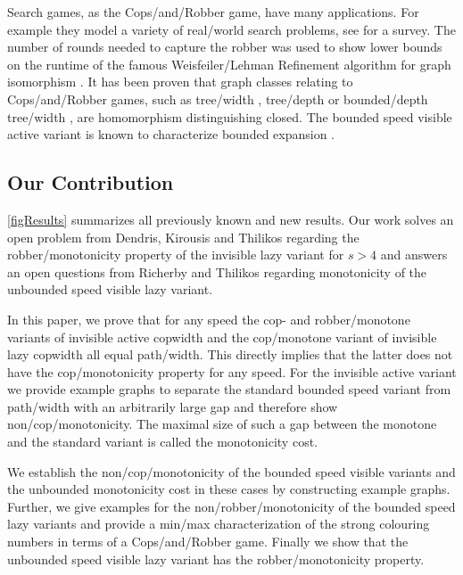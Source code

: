 Search games, as the Cops\-/and\-/Robber game, have many applications.
For example they model a variety of real\-/world search problems, see \cite{FominT08} for a survey.
The number of rounds needed to capture the robber was used to show lower bounds on the runtime of the famous Weisfeiler\-/Lehman Refinement algorithm for graph isomorphism \cite{Furer_rounds_2001,Grohe2023CR-vs-WL}.
It has been proven that graph classes relating to Cops\-/and\-/Robber games, such as tree\-/width \cite{Neuen_homomorphism-distinguishing_2023}, tree\-/depth \cite{Fluck_deep-wide_2023} or bounded\-/depth tree\-/width \cite{Adler_monotone_2024}, are homomorphism distinguishing closed.
The bounded speed visible active variant is known to characterize bounded expansion \cite{torunczyk2023flip}.

\subsection{Our Contribution}

\cref{figResults} summarizes all previously known and new results.
Our work solves an open problem from Dendris, Kirousis and Thilikos \cite{dendris1997fugitive} regarding the robber\-/monotonicity property of the invisible lazy variant for $s>4$ and answers an open questions from Richerby and Thilikos \cite{doi:10.1137/090780006} regarding monotonicity of the unbounded speed visible lazy variant.

In this paper, we prove that for any speed the cop- and robber\-/monotone variants of invisible active copwidth and the cop\-/monotone variant of invisible lazy copwidth all equal path\-/width. This directly implies that the latter does not have the cop\-/monotonicity property for any speed. For the invisible active variant we provide example graphs to separate the standard bounded speed variant from path\-/width with an arbitrarily large gap and therefore show non\-/cop\-/monotonicity. The maximal size of such a gap between the monotone and the standard variant is called the monotonicity cost.

We establish the non\-/cop\-/monotonicity of the bounded speed visible variants and the unbounded monotonicity cost in these cases by constructing example graphs. Further, we give examples for the non\-/robber\-/monotonicity of the bounded speed lazy variants and provide a min\-/max characterization of the strong colouring numbers in terms of a Cops\-/and\-/Robber game. Finally we show that the unbounded speed visible lazy variant has the robber\-/monotonicity property.